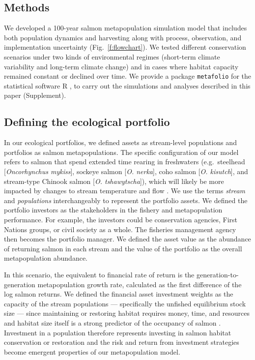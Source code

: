 \documentclass[12pt,english]{article}
\newcommand{\somR}{Supplement}
\begin{document}
\begin{spacing}{1.9}
\section{Methods}\label{methods}

We developed a 100-year salmon metapopulation simulation model that includes both population dynamics and harvesting along with process, observation, and implementation uncertainty (Fig.~\ref{f:flowchart}). We tested different conservation scenarios under two kinds of environmental regimes (short-term climate variability and long-term climate change) and in cases where habitat capacity remained constant or declined over time. We provide a package \texttt{metafolio} \citep{metafoliopkg} for the statistical software \textsf{R} \citep{r2013}, to carry out the simulations and analyses described in this paper (\somR).

\subsection{Defining the ecological portfolio}\label{defining-the-ecological-portfolio}

In our ecological portfolios, we defined assets as stream-level populations and portfolios as salmon metapopulations. The specific configuration of our model refers to salmon that spend extended time rearing in freshwaters (e.g.~steelhead {[}\emph{Oncorhynchus mykiss}{]}, sockeye salmon {[}\emph{O. nerka}{]}, coho salmon {[}\emph{O. kisutch}{]}, and stream-type Chinook salmon {[}\emph{O. tshawytscha}{]}), which will likely be more impacted by changes to stream temperature and flow \citep{mantua2010}. We use the terms \emph{stream} and \emph{populations} interchangeably to represent the portfolio assets. We defined the portfolio investors as the stakeholders in the fishery and metapopulation performance. For example, the investors could be conservation agencies, First Nations groups, or civil society as a whole. The fisheries management agency then becomes the portfolio manager. We defined the asset value as the abundance of returning salmon in each stream and the value of the portfolio as the overall metapopulation abundance.

In this scenario, the equivalent to financial rate of return is the generation-to-generation metapopulation growth rate, calculated as the first difference of the log salmon returns. We defined the financial asset investment weights as the capacity of the stream populations --- specifically the unfished equilibrium stock size --- since maintaining or restoring habitat requires money, time, and resources and habitat size itself is a strong predictor of the occupancy of salmon \citep{isaak2007}. Investment in a population therefore represents investing in salmon habitat conservation or restoration and the risk and return from investment strategies become emergent properties of our metapopulation model.


\end{spacing}
\end{document}
